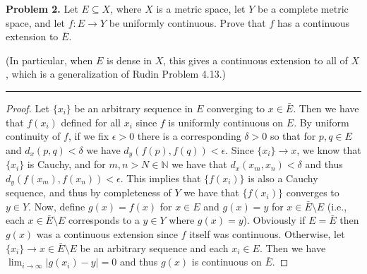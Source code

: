 \documentclass[leqno]{article}
\theoremstyle{nonumberplain}
\newtheorem{proof}{Proof}
\begin{document}


\noindent\textbf{Problem 2.} Let $E\subseteq X$, where $X$ is a metric space, let $Y$ be a complete metric space, and let $f\colon E \to Y$ be uniformly continuous. Prove that $f$ has a continuous extension to $\bar{E}$.

\noindent (In particular, when $E$ is dense in $X$, this gives a continuous extension to all of $X$, which is a generalization of Rudin Problem 4.13.)

\noindent\rule[0.5ex]{\linewidth}{1pt}

\begin{proof}
Let $\{x_i\}$ be an arbitrary sequence in $E$ converging to $x\in \bar{E}$.  Then we have that $f(x_i)$ defined for all $x_i$ since $f$ is uniformly continuous on $E$.  By uniform continuity of $f$, if we fix $\epsilon>0$ there is a corresponding $\delta>0$ so that for $p,q\in E$ and $d_x(p,q)<\delta$ we have $d_y(f(p),f(q))<\epsilon$.  Since $\{x_i\}\to x$, we know that $\{x_i\}$ is Cauchy, and for $m,n>N\in \mathbb{N}$ we have that $d_x(x_m,x_n)<\delta$ and thus $d_y(f(x_m),f(x_n))<\epsilon$.  This implies that $\{f(x_i)\}$ is also a Cauchy sequence, and thus by completeness of $Y$ we have that $\{f(x_i)\}$ converges to $y\in Y$.  Now, define $g(x)=f(x)$ for $x\in E$ and $g(x)=y$ for $x\in \bar{E}\setminus E$ (i.e., each $x\in \bar{E}\setminus E$ corresponds to a $y\in Y$ where $g(x)=y$).  Obviously if $E=\bar{E}$ then $g(x)$ was a continuous extension since $f$ itself was continuous.  Otherwise, let $\{x_i\}\to x\in \bar{E}\setminus E$ be an arbitrary sequence and each $x_i\in E$.  Then we have $\lim_{i\to \infty}|g(x_i)-y|=0$ and thus $g(x)$ is continuous on $\bar{E}$.
\end{proof}


\pagebreak


\end{document}
